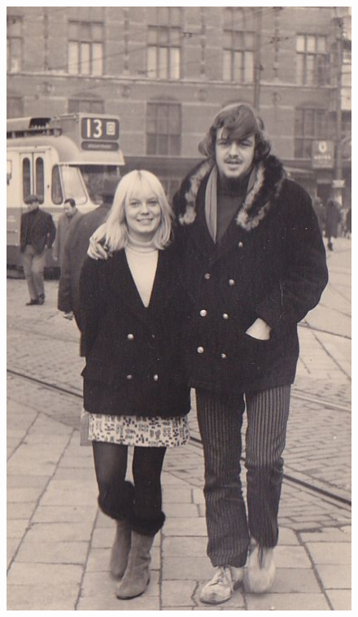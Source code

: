 \documentclass[12pt,twoside, openright]{memoir}
\begin{document}
\begin{figure}
\centering
\includegraphics[width=\textwidth]{img/180ohjeugd}
\end{figure} 
\end{document}
